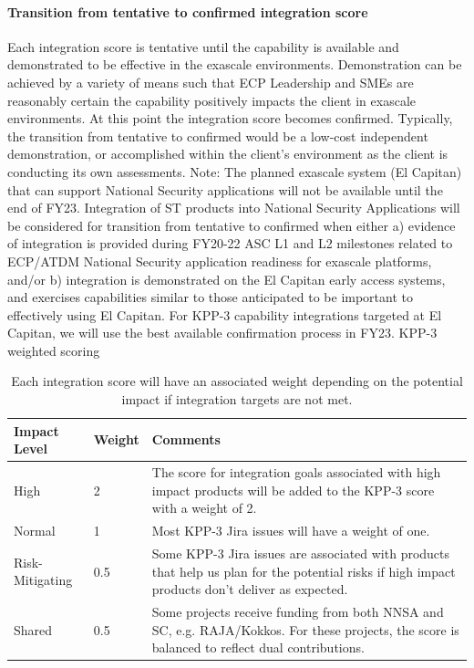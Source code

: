 \paragraph{Transition from tentative to confirmed integration score}
Each integration score is tentative until the capability is available and demonstrated to be effective in the exascale environments.  Demonstration can be achieved by a variety of means such that ECP Leadership and SMEs are reasonably certain the capability positively impacts the client in exascale environments.  At this point the integration score becomes confirmed. 
Typically, the transition from tentative to confirmed would be a low-cost independent demonstration, or accomplished within the client’s environment as the client is conducting its own assessments. 
Note: The planned exascale system (El Capitan) that can support National Security applications will not be available until the end of FY23. Integration of ST products into National Security Applications will be considered for transition from tentative to confirmed when either a) evidence of integration is provided during FY20-22 ASC L1 and L2 milestones related to ECP/ATDM National Security application readiness for exascale platforms, and/or b) integration is demonstrated on the El Capitan early access systems, and exercises capabilities similar to those anticipated to be important to effectively using El Capitan.  For KPP-3 capability integrations targeted at El Capitan, we will use the best available confirmation process in FY23.
KPP-3 weighted scoring

\begin{table}[h!]
	\begin{tabular}{|L{1.0in}|L{0.5in}|L{4.5in}|}\hline
		Impact Level & Weight & Comments\\\hline
		High & 2 & The score for integration goals associated with high impact products will be added to the KPP-3 score with a weight of 2.\\\hline
		Normal & 1 & Most KPP-3 Jira issues will have a weight of one.\\\hline
		Risk-Mitigating & 0.5 & Some KPP-3 Jira issues are associated with products that help us plan for the potential risks if high impact products don’t deliver as expected.\\\hline
		Shared  & 0.5 & Some projects receive funding from both NNSA and SC, e.g. RAJA/Kokkos. For these projects, the score is balanced to reflect dual contributions.\\\hline
	\end{tabular}
	\caption{\label{table:KPP-3-impact} Each integration score will have an associated weight depending on the potential impact if integration targets are not met.}
\end{table}

